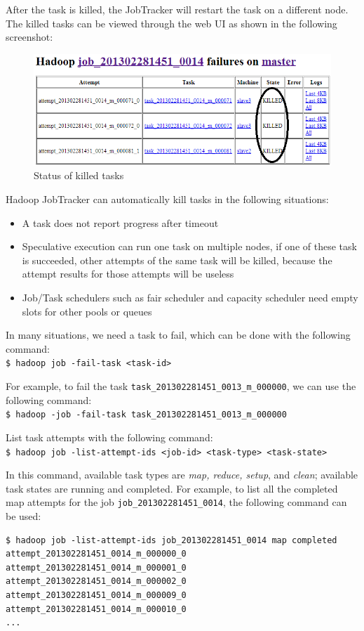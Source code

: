 After the task is killed, the JobTracker will restart the task on a different node. The killed tasks can be viewed through the web UI as shown in the following screenshot:
\begin{figure}[h]
  \centering
  \includegraphics[width=\textwidth]{figs/5163os_04_14.png}
  \caption{Status of killed tasks}\label{fig:mapred.killed.tasks}
\end{figure} 


Hadoop JobTracker can automatically kill tasks in the following situations:
\begin{itemize}
  \item A task does not report progress after timeout
  \item Speculative execution can run one task on multiple nodes, if one of these task is succeeded, other attempts of the same task will be killed, because the attempt results for those attempts will be useless
  \item Job/Task schedulers such as fair scheduler and capacity scheduler need empty slots for other pools or queues
\end{itemize}

In many situations, we need a task to fail, which can be done with the following command: \\
\verb|$ hadoop job -fail-task <task-id> |

For example, to fail the task \verb|task_201302281451_0013_m_000000|, we can use the following command: \\ 
\verb|$ hadoop -job -fail-task task_201302281451_0013_m_000000|

List task attempts with the following command: \\
\verb|$ hadoop job -list-attempt-ids <job-id> <task-type> <task-state>|

In this command, available task types are \emph{map, reduce, setup}, and \emph{clean}; available task states are running and completed.
For example, to list all the completed map attempts for the job \verb|job_201302281451_0014|, the following command can be used: 
\begin{verbatim}
$ hadoop job -list-attempt-ids job_201302281451_0014 map completed
attempt_201302281451_0014_m_000000_0
attempt_201302281451_0014_m_000001_0
attempt_201302281451_0014_m_000002_0
attempt_201302281451_0014_m_000009_0
attempt_201302281451_0014_m_000010_0
...
\end{verbatim}

